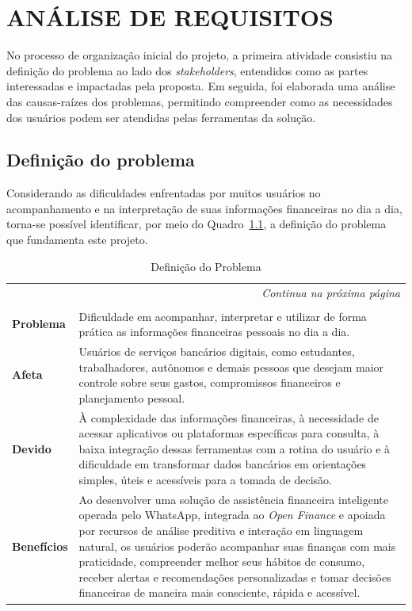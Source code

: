 \chapter{ANÁLISE DE REQUISITOS}

No processo de organização inicial do projeto, a primeira atividade consistiu na definição do problema ao lado dos \textit{stakeholders}, entendidos como as partes interessadas e impactadas pela proposta. Em seguida, foi elaborada uma análise das causas-raízes dos problemas, permitindo compreender como as necessidades dos usuários podem ser atendidas pelas ferramentas da solução.

\section{Definição do problema}

Considerando as dificuldades enfrentadas por muitos usuários no acompanhamento e na interpretação de suas informações financeiras no dia a dia, torna-se possível identificar, por meio do Quadro~\ref{quad:problema}, a definição do problema que fundamenta este projeto.

{\small
\begin{longtable}{|l|p{10cm}|}
\caption{Definição do Problema}
\label{quad:problema} \\
\hline
\endfirsthead
\hline
\endhead
\hline
\multicolumn{2}{r}{\fontsize{10pt}{10pt}\selectfont\textit{Continua na próxima página}} \\
\endfoot
\hline
\multicolumn{2}{c}{\fontsize{10pt}{10pt}\selectfont \textbf{Fonte:} Elaborado pelos autores (2026).} \\
\endlastfoot
\textbf{Problema} & Dificuldade em acompanhar, interpretar e utilizar de forma prática as informações financeiras pessoais no dia a dia. \\ \hline
\textbf{Afeta} & Usuários de serviços bancários digitais, como estudantes, trabalhadores, autônomos e demais pessoas que desejam maior controle sobre seus gastos, compromissos financeiros e planejamento pessoal. \\ \hline
\textbf{Devido} & À complexidade das informações financeiras, à necessidade de acessar aplicativos ou plataformas específicas para consulta, à baixa integração dessas ferramentas com a rotina do usuário e à dificuldade em transformar dados bancários em orientações simples, úteis e acessíveis para a tomada de decisão. \\ \hline
\textbf{Benefícios} & Ao desenvolver uma solução de assistência financeira inteligente operada pelo WhatsApp, integrada ao \textit{Open Finance} e apoiada por recursos de análise preditiva e interação em linguagem natural, os usuários poderão acompanhar suas finanças com mais praticidade, compreender melhor seus hábitos de consumo, receber alertas e recomendações personalizadas e tomar decisões financeiras de maneira mais consciente, rápida e acessível. \\ \hline
\end{longtable}
}


